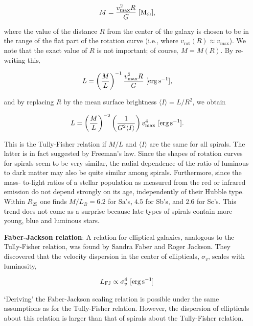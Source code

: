 \documentclass[a4paper,11pt]{article}
\begin{document}
\begin{align*}
    M = \frac{v_\mathrm{max}^2R}{G} ~ [{\rm M_\odot}],
\end{align*}

{\noindent}where the value of the distance $R$ from the center of the galaxy is chosen to be in the range of the flat part of the rotation curve (i.e., where $v_\mathrm{rot}(R)\approx v_\mathrm{max}$). We note that the exact value of $R$ is not important; of course, $M=M(R)$. By re-writing this,

\begin{align*}
    L = \left(\frac{M}{L}\right)^{-1} \frac{v_\mathrm{max}^2R}{G} ~ [{\rm erg\,s^{-1}}],
\end{align*}

{\noindent}and by replacing $R$ by the mean surface brightness $\langle I\rangle=L/R^2$, we obtain

\begin{align*}
    L = \left(\frac{M}{L}\right)^{-2} \left(\frac{1}{G^2\langle I\rangle}\right)v_\mathrm{max}^4 ~ [{\rm erg\,s^{-1}}].
\end{align*}

{\noindent}This is the Tully-Fisher relation if $M/L$ and $\langle I\rangle$ are the same for all spirals. The latter is in fact suggested by Freeman’s law. Since the shapes of rotation curves for spirals seem to be very similar, the radial dependence of the ratio of luminous to dark matter may also be quite similar among spirals. Furthermore, since the mass- to-light ratios of a stellar population as measured from the red or infrared emission do not depend strongly on its age, independently of their Hubble type. Within $R_{25}$ one finds $M/L_B=6.2$ for Sa's, $4.5$ for Sb's, and $2.6$ for Sc's. This trend does not come as a surprise because late types of spirals contain more young, blue and luminous stars.

{\noindent}\textbf{Faber-Jackson relation}: A relation for elliptical galaxies, analogous to the Tully-Fisher relation, was found by Sandra Faber and Roger Jackson. They discovered that the velocity dispersion in the center of ellipticals, $\sigma_v$, scales with luminosity,

\begin{align*}
    L_\mathrm{FJ} \propto \sigma_v^4 ~ [{\rm erg\,s^{-1}}]
\end{align*}

{\noindent}`Deriving' the Faber-Jackson scaling relation is possible under the same assumptions as for the Tully-Fisher relation. However, the dispersion of ellipticals about this relation is larger than that of spirals about the Tully-Fisher relation.
\end{document}
